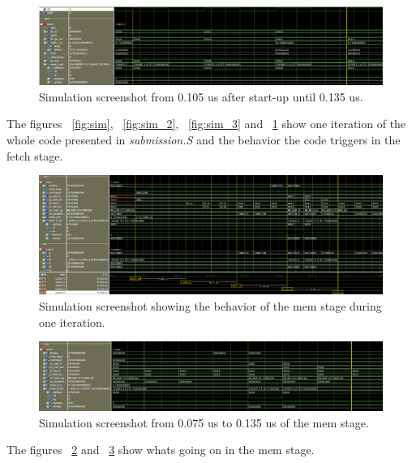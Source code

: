 \documentclass[11pt,a4paper,titlepage,oneside]{article}
\begin{document}
\begin{figure}[ht!]
	\centering
	\includegraphics[width=1.0\linewidth]{fig/fetch_0_105_to_0_135.png}
	\caption{Simulation screenshot from 0.105 us after start-up until 0.135 us.}
	\label{fig:sim_4}
\end{figure}

The figures ~\ref{fig:sim}, ~\ref{fig:sim_2}, ~\ref{fig:sim_3} and  ~\ref{fig:sim_4} show one iteration
of the whole code presented in \textit{submission.S} and the behavior the code triggers in the fetch stage. \par 
 
\begin{figure}[ht!]
	\centering
	\includegraphics[width=1.0\linewidth]{fig/mem_full_transition.png}
	\caption{Simulation screenshot showing the behavior of the mem stage during one iteration.}
	\label{fig:mem_full}
\end{figure}


\begin{figure}[ht!]
	\centering
	\includegraphics[width=1.0\linewidth]{fig/mem_0_075_to_0_135.png}
	\caption{Simulation screenshot from 0.075 us to 0.135 us of the mem stage.}
	\label{fig:mem_act}
\end{figure}

The figures ~\ref{fig:mem_full} and ~\ref{fig:mem_act} show whats going on in the mem stage. 
\end{document}
